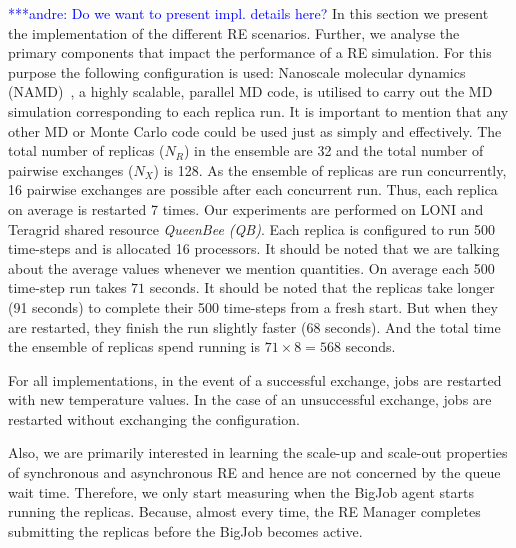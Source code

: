 \documentclass{rspublic}
\newcommand{\alnote}[1]{ {\textcolor{blue} { ***andre: #1 }}}
\newcommand{\alnote}[1]{}
\begin{document}
\alnote{Do we want to present impl. details here?} 
In this section we present the implementation of the different RE scenarios. 
Further, we analyse the primary components that impact the performance of a RE
simulation.  For this purpose the following configuration is used:
Nanoscale molecular dynamics (NAMD)~\citep{Phillips:2005gd}, a highly
scalable, parallel MD code, is utilised to carry out the MD simulation
corresponding to each replica run. It is important to mention that any
other MD or Monte Carlo code could be used just as simply and
effectively. The total number of replicas ($N_R$) in the ensemble are
32 and the total number of pairwise exchanges ($N_X$) is 128. As the
ensemble of replicas are run concurrently, 16 pairwise exchanges are
possible after each concurrent run. Thus, each replica on average is
restarted 7 times.  Our experiments are performed on LONI and Teragrid
shared resource \emph{QueenBee (QB)}. Each replica is configured to run 500
time-steps and is allocated 16 processors. It should be noted that we
are talking about the average values whenever we mention
quantities. %
On average each 500 time-step run takes $71$ seconds. 
It should be noted that the replicas take longer (91 seconds) to
complete their 500 time-steps from a fresh start. But when they are
restarted, they finish the run slightly faster (68 seconds).  And the
total time the ensemble of replicas spend running is $71 \times 8 =
568$ seconds.
  
For all implementations, in the event of a successful exchange, jobs
are restarted~\citep{Luckow:2008fp} with new temperature values.  In
the case of an unsuccessful exchange, jobs are restarted without
exchanging the configuration.
 
Also, we are primarily interested in learning the scale-up and
scale-out properties of synchronous and asynchronous RE and hence are
not concerned by the queue wait time. Therefore, we only start
measuring when the BigJob agent starts running the replicas. Because,
almost every time, the RE Manager completes submitting the replicas
before the BigJob becomes active.
\end{document}
